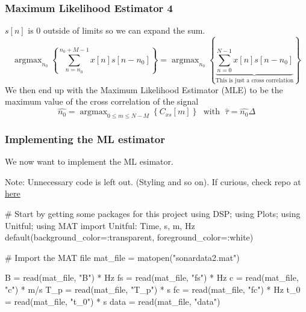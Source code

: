 \documentclass[compress]{beamer}
\DeclareMathOperator*{\argmax}{argmax}
\begin{document}
\begin{frame} %
  \frametitle{Maximum Likelihood Estimator 4}
    $s[n]$ is 0 outside of limits so we can expand the sum.
    \begin{equation*}
        \argmax_{n_0}
        \left\{
        \sum^{n_0+M-1}_{n=n_0}{x[n]s[n-n_0]}
        \right\} = 
        \argmax_{n_0}\left\{
            \underbrace{ \sum^{N-1}_{n=0}{x[n]s[n-n_0]} }_{
                \text{This is just a cross correlation}
            }
        \right\}
    \end{equation*}
    We then end up with the Maximum Likelihood Estimator (MLE) to be the
    maximum value of the cross correlation of the signal
    \begin{equation*}
        \widehat{n_0}=\argmax_{0\le m \le N-M}\left\{C_{xs}\left[m\right]\right\} \;\text{ with }\; \widehat{\tau} = \widehat{n_0}\Delta
    \end{equation*}
\end{frame} %

\begin{frame}[fragile] %
    \frametitle{Implementing the ML estimator}
    We now want to implement the ML esimator.

    Note: Unnecessary code is left out. (Styling and so on). If curious,
    check repo at \href{https://github.com/Dainou01/Studies/tree/main/IN5340/Project2}{here}
    \begin{jllisting}[gobble=8]
        #  Start by getting some packages for this project
        using DSP; using Plots; using Unitful; using MAT
        import Unitful: Time, s, m, Hz
        default(background_color=:transparent, foreground_color=:white)

        # Import the MAT file 
        mat_file = matopen("sonardata2.mat")

        B    = read(mat_file, "B")    * Hz
        fs   = read(mat_file, "fs")   * Hz
        c    = read(mat_file, "c")    * m/s
        T_p  = read(mat_file, "T_p")  * s
        fc   = read(mat_file, "fc")   * Hz
        t_0  = read(mat_file, "t_0")  * s
        data = read(mat_file, "data")
    \end{jllisting}
\end{frame} 
\end{document}
